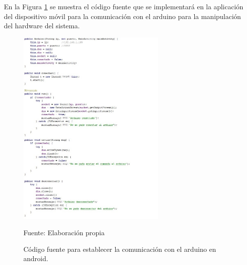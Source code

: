 En la Figura \ref{fig:figura3.63} se muestra el código fuente que se implementará en la aplicación del dispositivo móvil para la comunicación con el arduino para la manipulación del hardware del sistema.
\begin{figure}[H]
\captionsetup{justification=centering}
\begin{center}
\includegraphics[width=0.65\textwidth]{Imagenes/Cap3/image063}
\end{center}
\begin{center}
\vskip -0.5cm
\caption{\small{Código fuente para establecer la comunicación con el arduino en android.}}
\label{fig:figura3.63}
{\small{Fuente: Elaboración propia}}
\end{center}
\end{figure}

